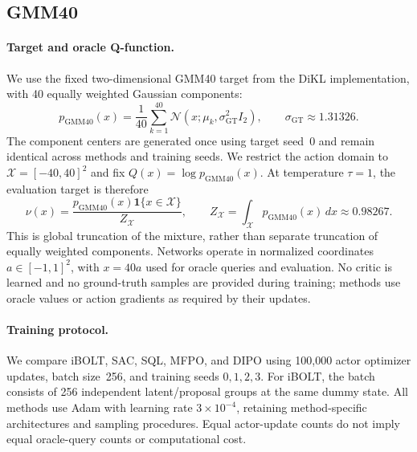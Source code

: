 \subsection{GMM40}
\label{app:gmm40}

\paragraph{Target and oracle Q-function.}
We use the fixed two-dimensional GMM40 target from the DiKL implementation,
with 40 equally weighted Gaussian components:
\begin{equation}
p_{\mathrm{GMM40}}(x)
=\frac{1}{40}\sum_{k=1}^{40}
\mathcal{N}(x;\mu_k,\sigma_{\mathrm{GT}}^2 I_2),
\qquad \sigma_{\mathrm{GT}}\approx 1.31326.
\end{equation}
The component centers are generated once using target seed~0 and remain
identical across methods and training seeds. We restrict the action domain
to $\mathcal{X}=[-40,40]^2$ and fix $Q(x)=\log p_{\mathrm{GMM40}}(x)$.
At temperature $\tau=1$, the evaluation target is therefore
\begin{equation}
\nu(x)=\frac{p_{\mathrm{GMM40}}(x)\mathbf{1}\{x\in\mathcal{X}\}}{Z_{\mathcal{X}}},
\qquad
Z_{\mathcal{X}}=\int_{\mathcal{X}}p_{\mathrm{GMM40}}(x)\,dx
\approx 0.98267.
\end{equation}
This is global truncation of the mixture, rather than separate truncation
of equally weighted components. Networks operate in normalized coordinates
$a\in[-1,1]^2$, with $x=40a$ used for oracle queries and evaluation.
No critic is learned and no ground-truth samples are provided during training;
methods use oracle values or action gradients as required by their updates.

\paragraph{Training protocol.}
We compare iBOLT, SAC, SQL, MFPO, and DIPO using 100{,}000 actor optimizer
updates, batch size~256, and training seeds $0,1,2,3$.
For iBOLT, the batch consists of 256 independent latent/proposal groups
at the same dummy state. All methods use Adam with learning rate
$3\times10^{-4}$, retaining method-specific architectures and sampling
procedures. Equal actor-update counts do not imply equal oracle-query
counts or computational cost.

